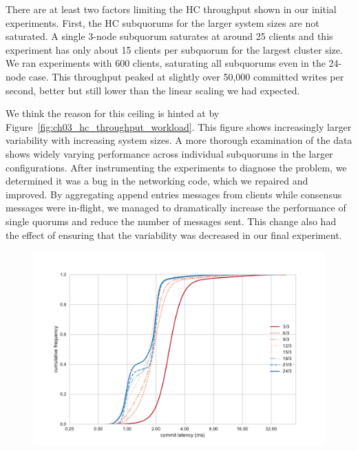 There are at least two factors limiting the HC throughput shown in our initial experiments.
First, the HC subquorums for the larger system sizes are not saturated.
A single 3-node subquorum saturates at around 25 clients and this experiment has only about 15 clients per subquorum for the largest cluster size.
We ran experiments with 600 clients, saturating all subquorums even in the 24-node case.
This throughput peaked at slightly over 50,000 committed writes per second, better but still lower than the linear scaling we had expected.

We think the reason for this ceiling is hinted at by Figure~\ref{fig:ch03_hc_throughput_workload}.
This figure shows increasingly larger variability with increasing system sizes.
A more thorough examination of the data shows widely varying performance across individual subquorums in the larger configurations.
After instrumenting the experiments to diagnose the problem, we determined it was a bug in the networking code, which we repaired and improved.
By aggregating append entries messages from clients while consensus messages were in-flight, we managed to dramatically increase the performance of single quorums and reduce the number of messages sent.
This change also had the effect of ensuring that the variability was decreased in our final experiment.

\begin{figure}
    \begin{center}
        \includegraphics[width=5in]{figures/ch03_ec2_latency_cumfreq.pdf}
    \end{center}
    \renewcommand{\baselinestretch}{1}
    \small\normalsize

    \begin{quote}
        \caption[HC Cumulative Latency Distribution]{}
        \label{fig:ch03_ec2_latency_cumfreq}
    \end{quote}
\end{figure}
\renewcommand{\baselinestretch}{2}
\small\normalsize

